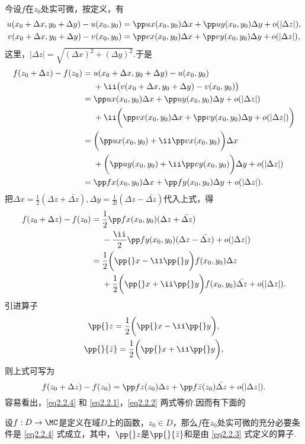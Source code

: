 今设$f$在$z_0$处实可微，按定义，有
\begin{gather}
u(x_0+\Delta x,y_0+\Delta y)-u(x_0,y_0)=\pp ux(x_0,y_0)\Delta x+\pp uy(x_0,y_0)\Delta y+o(|\Delta z|),\label{eq2.2.1}\\
v(x_0+\Delta x,y_0+\Delta y)-v(x_0,y_0)=\pp vx(x_0,y_0)\Delta x+\pp vy(x_0,y_0)\Delta y+o(|\Delta z|)\label{eq2.2.2},
\end{gather}
这里，$|\Delta z|=\sqrt{(\Delta x)^2+(\Delta y)^2}$.于是
\begin{align*}
  f(z_0+\Delta z)-f(z_0)={}&u(x_0+\Delta x,y_0+\Delta y)-u(x_0,y_0)\\
  &+  \ii\big(v(x_0+\Delta x,y_0+\Delta y)-v(x_0,y_0)\big)\\
  ={}&\pp ux(x_0,y_0)\Delta x+\pp uy(x_0,y_0)\Delta y+o(|\Delta z|)\\
  &+\ii\bigg(\pp vx(x_0,y_0)\Delta x+\pp vy(x_0,y_0)\Delta y+o(|\Delta z|)\bigg)\\
  ={}&\bigg(\pp ux(x_0,y_0)+\ii\pp vx(x_0,y_0)\bigg)\Delta x\\
  &+\bigg(\pp uy(x_0,y_0)+\ii\pp vy(x_0,y_0)\bigg)\Delta y+o(|\Delta z|)\\
  ={}&\pp fx(x_0,y_0)\Delta x+\pp fy(x_0,y_0)\Delta y+o(|\Delta z|).
\end{align*}
把$\Delta x=\frac12(\Delta z+\bar{\Delta z}),\Delta y=\frac1{2\ii}(\Delta z-\bar{\Delta z})$代入上式，得
\begin{align*}
  f(z_0+\Delta z)-f(z_0)={}&\frac12\pp fx(x_0,y_0)(\Delta z+\bar{\Delta z})\\
  &-\frac{\ii}2\pp fy(x_0,y_0)(\Delta z-\bar{\Delta z})+o(|\Delta z|)\\
  ={}&\frac12\bigg(\pp {}x-\ii\pp{}y\bigg)f(x_0,y_0)\Delta z\\
  &+\frac12\bigg(\pp{}x+\ii\pp{}y\bigg)f(x_0,y_0)\bar{\Delta z}+o(|\Delta z|).
\end{align*}
引进算子
\begin{equation}\label{eq2.2.3}
\begin{gathered}
  \pp{}z=\frac12\bigg(\pp{}x-\ii\pp{}y\bigg),\\
  \pp{}{\bar z}=\frac12\bigg(\pp{}x+\ii\pp{}y\bigg),
\end{gathered}
\end{equation}
则上式可写为
\begin{equation}\label{eq2.2.4}
  f(z_0+\Delta z)-f(z_0)=\pp fz(z_0)\Delta z+\pp f{\bar z}(z_0)\bar{\Delta z}+o(|\Delta z|).
\end{equation}
容易看出，\eqref{eq2.2.4} 和 \eqref{eq2.2.1}，\eqref{eq2.2.2} 两式等价.因而有下面的
\begin{prop}
设$f:D\to\MC$是定义在域$D$上的函数，$z_0\in D$，那么$f$在$z_0$处实可微的充分必要条件是  \eqref{eq2.2.4} 式成立，其中，$\pp{}z$是$\pp{}{\bar z}$和是由 \eqref{eq2.2.3} 式定义的算子.
\end{prop}


